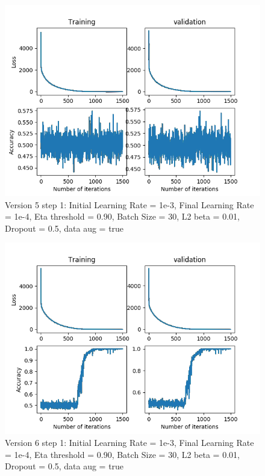 \documentclass[12pt,reqno]{amsart}
\numberwithin{equation}{section}
\begin{document}
\begin{enumerate}
\begin{figure}[H]
\centering
\includegraphics[scale=0.6]{data_liquid25_version5_step1}
\caption{Version 5 step 1: Initial Learning Rate = 1e-3, Final Learning Rate = 1e-4, Eta threshold = 0.90, Batch Size = 30, L2 beta = 0.01, Dropout = 0.5, data aug = true}
\end{figure}

\begin{figure}[H]
\centering
\includegraphics[scale=0.6]{data_liquid25_version6_step1}
\caption{Version 6 step 1: Initial Learning Rate = 1e-3, Final Learning Rate = 1e-4, Eta threshold = 0.90, Batch Size = 30, L2 beta = 0.01, Dropout = 0.5, data aug = true}
\end{figure}


\end{enumerate}
\end{document}

